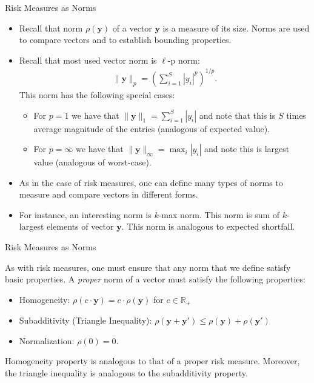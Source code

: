 \documentclass[9pt]{beamer}
\begin{document}
%
\begin{frame}{Risk Measures as Norms}

\begin{itemize}
\item Recall that norm $\rho(\mathbf{y})$ of a vector $\mathbf{y}$ is a measure of its size. Norms are used to compare vectors and to establish bounding properties.   

\item Recall that most used vector norm is $\ell$-p norm:
\begin{align*}
\|\mathbf{y}\|_p=\left(\sum_{i=1}^S|y_i|^p\right)^{1/p}.
\end{align*}
This norm has the following special cases:
\begin{itemize}
\item For $p=1$  we have that $\|\mathbf{y}\|_1=\sum_{i=1}^S|y_i|$ and note that this is $S$ times average magnitude of the entries (analogous of expected value). 
\item For $p=\infty$ we have that $\|\mathbf{y}\|_\infty=\max_{i} |y_i|$ and note this is largest value (analogous of worst-case). 
\end{itemize}
\item As in the case of risk measures, one can define many types of norms to measure and compare vectors in different forms. 

\item For instance, an interesting norm is $k$-max norm. This norm is sum of $k$-largest elements of vector $\mathbf{y}$. This norm is analogous to expected shortfall.   
\end{itemize}

\end{frame}


%
\begin{frame}{Risk Measures as Norms}

As with risk measures, one must ensure that any norm that we define satisfy basic properties.  A {\em proper} norm of a vector must satisfy the following properties:

\begin{itemize}
\item Homogeneity: $\rho(c\cdot \mathbf{y})=c\cdot \rho(\mathbf{y})$ for $c\in \mathbb{R}_+$
\item Subadditivity (Triangle Inequality): $\rho(\mathbf{y}+\mathbf{y}')\leq \rho(\mathbf{y})+\rho(\mathbf{y}')$
\item Normalization: $\rho(0)=0$.
\end{itemize}
Homogeneity property is analogous to that of a proper risk measure. Moreover, the triangle inequality is analogous to the  subadditivity property. 

\end{frame}
\end{document}

